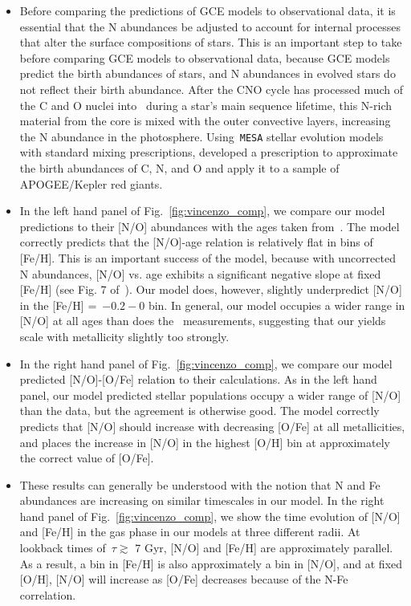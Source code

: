 \documentclass[ms.tex]{subfiles}
\begin{document}
\begin{itemize} 
	\item Before comparing the predictions of GCE models to observational data, 
	it is essential that the N abundances be adjusted to account for internal 
	processes that alter the surface compositions of stars. 
	This is an important step to take before comparing GCE models to 
	observational data, because GCE models predict the birth abundances of 
	stars, and N abundances in evolved stars do not reflect their birth 
	abundance. 
	After the CNO cycle has processed much of the C and O nuclei into~\Nfourteen 
	during a star's main sequence lifetime, this N-rich material from the core 
	is mixed with the outer convective layers, increasing the N abundance in 
	the photosphere. 
	Using~\texttt{MESA} stellar evolution models~\citep{Paxton2011, Paxton2013, 
	Paxton2015, Paxton2018} with standard mixing prescriptions, 
	\citet{Vincenzo2021} developed a prescription to approximate the birth 
	abundances of C, N, and O and apply it to a sample of APOGEE/Kepler red 
	giants. 

	\item In the left hand panel of Fig.~\ref{fig:vincenzo_comp}, we compare 
	our model predictions to their [N/O] abundances with the ages taken 
	from~\citet{Miglio2021}. 
	The model correctly predicts that the [N/O]-age relation is relatively flat 
	in bins of [Fe/H]. 
	This is an important success of the model, because with uncorrected N 
	abundances, [N/O] vs. age exhibits a significant negative slope at fixed 
	[Fe/H] (see Fig. 7 of~\citealp{Vincenzo2021}). 
	Our model does, however, slightly underpredict [N/O] in the 
	[Fe/H] =~$-0.2 - 0$ bin. 
	In general, our model occupies a wider range in [N/O] at all ages than does 
	the~\citet{Vincenzo2021} measurements, suggesting that our yields scale 
	with metallicity slightly too strongly. 

	\item In the right hand panel of Fig.~\ref{fig:vincenzo_comp}, we compare 
	our model predicted [N/O]-[O/Fe] relation to their calculations. 
	As in the left hand panel, our model predicted stellar populations occupy a 
	wider range of [N/O] than the data, but the agreement is otherwise good. 
	The model correctly predicts that [N/O] should increase with decreasing 
	[O/Fe] at all metallicities, and places the increase in [N/O] in the 
	highest [O/H] bin at approximately the correct value of [O/Fe]. 

	\item These results can generally be understood with the notion that 
	N and Fe abundances are increasing on similar timescales in our model. 
	In the right hand panel of Fig.~\ref{fig:vincenzo_comp}, we show the time 
	evolution of [N/O] and [Fe/H] in the gas phase in our models at three 
	different radii. 
	At lookback times of~$\tau \gtrsim$ 7 Gyr, [N/O] and [Fe/H] are 
	approximately parallel. 
	As a result, a bin in [Fe/H] is also approximately a bin in [N/O], and at 
	fixed [O/H], [N/O] will increase as [O/Fe] decreases because of the N-Fe 
	correlation. 


\end{itemize}
\end{document}
